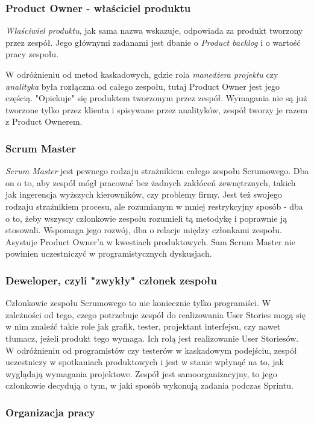 \documentclass{article}
\begin{document}
\subsubsection*{Product Owner - właściciel produktu}
\textit{Właściwiel produktu}, jak sama nazwa wskazuje, odpowiada za produkt tworzony przez zespół. Jego głównymi zadanami jest dbanie o \textit{Product backlog} i o wartość pracy zespołu.

W odróżnieniu od metod kaskadowych, gdzie rola \textit{manedżera projektu} czy \textit{analityka} była rozłączna od całego zespołu, tutaj Product Owner jest jego częścią. "Opiekuje" się produktem tworzonym przez zespół. Wymagania nie są już tworzone tylko przez klienta i spisywane przez analityków, zespół tworzy je razem z Product Ownerem\cite{scrum}.
\subsubsection*{Scrum Master}

\textit{Scrum Master} jest pewnego rodzaju strażnikiem całego zespołu Scrumowego. Dba on o to, aby zespół mógł pracować bez żadnych zakłóceń zewnętrznych, takich jak ingerencja wyższych kierowników, czy problemy firmy. Jest też swojego rodzaju strażnikiem procesu, ale rozumianym w mniej restrykcyjny sposób - dba o to, żeby wszyscy członkowie zespołu rozumieli tą metodykę i poprawnie ją stosowali. Wspomaga jego rozwój, dba o relacje między członkami zespołu. Asystuje Product Owner'a w kwestiach produktowych. Sam Scrum Master nie powinien uczestniczyć w programistycznych dyskusjach\cite{scrum}.

\subsubsection*{Deweloper, czyli "zwykły" członek zespołu}
Członkowie zespołu Scrumowego to nie koniecznie tylko programiści. W zależności od tego, czego potrzebuje zespół do realizowania User Stories mogą się w nim znaleźć takie role jak grafik, tester, projektant interfejsu, czy nawet tłumacz, jeżeli produkt tego wymaga. Ich rolą jest realizowanie User Storiesów. W odróżnieniu od programistów czy testerów w kaskadowym podejściu, zespół uczestniczy w spotkaniach produktowych i jest w stanie wpłynąć na to, jak wyglądają wymagania projektowe. Zespół jest samoorganizacyjny, to jego członkowie decydują o tym, w jaki sposób wykonują zadania podczas Sprintu.

\subsubsection{Organizacja pracy}
\end{document}
